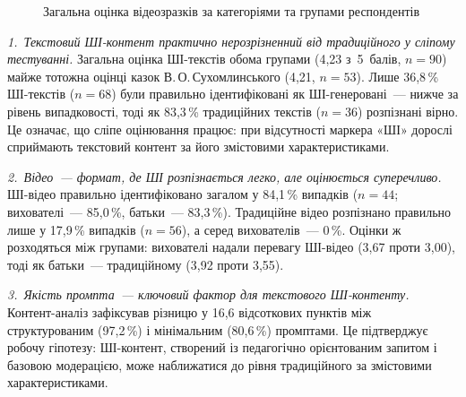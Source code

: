 \documentclass[14pt, a4paper]{extreport}
\begin{document}
\begin{figure}[htbp]
\centering
{}
\caption{Загальна оцінка відеозразків за категоріями та групами респондентів}
\end{figure}

\textit{1.~Текстовий ШІ-контент практично нерозрізненний від традиційного у сліпому тестуванні.} Загальна оцінка ШІ-текстів обома групами (4{,}23 з~5~балів, $n=90$) майже тотожна оцінці казок В.\,О.\,Сухомлинського (4{,}21, $n=53$). Лише 36{,}8\,\% ШІ-текстів ($n=68$) були правильно ідентифіковані як ШІ-генеровані~--- нижче за рівень випадковості, тоді як 83{,}3\,\% традиційних текстів ($n=36$) розпізнані вірно. Це означає, що сліпе оцінювання працює: при відсутності маркера «ШІ» дорослі сприймають текстовий контент за його змістовими характеристиками.

\textit{2.~Відео~--- формат, де ШІ розпізнається легко, але оцінюється суперечливо.} ШІ-відео правильно ідентифіковано загалом у 84{,}1\,\% випадків ($n=44$; вихователі~--- 85{,}0\,\%, батьки~--- 83{,}3\,\%). Традиційне відео розпізнано правильно лише у 17{,}9\,\% випадків ($n=56$), а серед вихователів~--- 0\,\%. Оцінки ж розходяться між групами: вихователі надали перевагу ШІ-відео (3{,}67 проти 3{,}00), тоді як батьки~--- традиційному (3{,}92 проти 3{,}55).

\textit{3.~Якість промпта~--- ключовий фактор для текстового ШІ-контенту.} Контент-аналіз зафіксував різницю у 16{,}6 відсоткових пунктів між структурованим (97{,}2\,\%) і мінімальним (80{,}6\,\%) промптами. Це підтверджує робочу гіпотезу: ШІ-контент, створений із педагогічно орієнтованим запитом і базовою модерацією, може наближатися до рівня традиційного за змістовими характеристиками.
\end{document}
